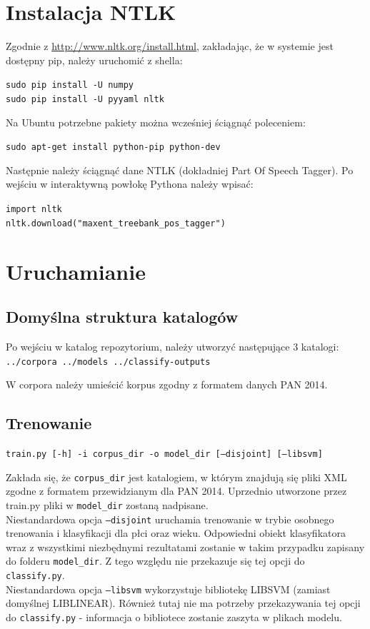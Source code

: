 \documentclass{article}
\begin{document}
\section{Instalacja NTLK}

Zgodnie z \href{http://www.nltk.org/install.html}{http://www.nltk.org/install.html}, zakładając, że w systemie jest dostępny pip, należy uruchomić z shella:

\texttt{sudo pip install -U numpy \\
sudo pip install -U pyyaml nltk}

Na Ubuntu potrzebne pakiety można wcześniej ściągnąć poleceniem:

\texttt{sudo apt-get install python-pip python-dev}

Następnie należy ściągnąć dane NTLK (dokładniej Part Of Speech Tagger). Po wejściu w interaktywną powłokę Pythona należy wpisać:

\texttt{import nltk \\
nltk.download("maxent\_treebank\_pos\_tagger")}


\section{Uruchamianie}

\subsection{Domyślna struktura katalogów}

Po wejściu w katalog repozytorium, należy utworzyć następujące 3 katalogi:
\texttt{
../corpora
../models
../classify-outputs
}

W corpora należy umieścić korpus zgodny z formatem danych PAN 2014.

\subsection{Trenowanie}

\texttt{train.py [-h] -i corpus\_dir -o model\_dir [--disjoint] [--libsvm]}

Zakłada się, że \texttt{corpus\_dir} jest katalogiem, w którym znajdują się pliki XML zgodne z formatem przewidzianym dla PAN 2014. Uprzednio utworzone przez train.py pliki w \texttt{model\_dir} zostaną nadpisane. \\
Niestandardowa opcja \texttt{--disjoint} uruchamia trenowanie w trybie osobnego trenowania i klasyfikacji dla płci oraz wieku. Odpowiedni obiekt klasyfikatora wraz z wszystkimi niezbędnymi rezultatami zostanie w takim przypadku zapisany do folderu \texttt{model\_dir}. Z tego względu nie przekazuje się tej opcji do \texttt{classify.py}. \\
Niestandardowa opcja \texttt{--libsvm} wykorzystuje bibliotekę LIBSVM (zamiast domyślnej LIBLINEAR). Również tutaj nie ma potrzeby przekazywania tej opcji do \texttt{classify.py} - informacja o bibliotece zostanie zaszyta w plikach modelu.
\end{document}
